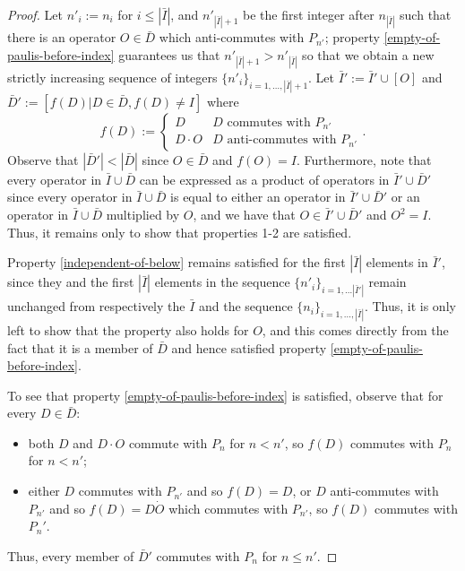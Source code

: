 \documentclass[twocolumn,showpacs,preprintnumbers,amsmath,amssymb,nofootinbib,pra,floatfix]{revtex4}
\newcommand{\lst}{\bar}
\begin{document}
\begin{proof}
Let $n'_i:=n_i$ for $i\le|\lst I|$, and $n'_{|\lst I|+1}$ be the first integer after $n_{|\lst I|}$ such that there is an operator $O\in\lst D$ which anti-commutes with $P_{n'}$;  property \ref{empty-of-paulis-before-index} guarantees us that $n'_{|\lst I|+1}>n'_{|\lst I|}$ so that we obtain a new strictly increasing sequence of integers $\{n'_i\}_{i=1,\dots,|\lst I|+1}$.  Let $\lst I':=\lst I'\cup [O]$ and $\lst D':=[f(D)|D\in \lst D, f(D)\ne I]$ where 
$$f(D):=
\begin{cases}
D & \text{$D$ commutes with $P_{n'}$} \\
D\cdot O & \text{$D$ anti-commutes with $P_{n'}$}
\end{cases}.$$  Observe that $|\lst D'|<|\lst D|$ since $O\in \lst D$ and $f(O)=I$.  Furthermore, note that every operator in $\lst I\cup \lst D$ can be expressed as a product of operators in $\lst I'\cup \lst D'$ since every operator in $\lst I\cup \lst D$ is equal to either an operator in $\lst I'\cup\lst D'$ or an operator in $\lst I\cup\lst D$ multiplied by $O$, and we have that $O\in \lst I'\cup \lst D'$ and $O^2=I$.  Thus, it remains only to show that properties 1-2 are satisfied.

Property \ref{independent-of-below} remains satisfied for the first $|\lst I|$ elements in $\lst I'$, since they and the first $|\lst I|$  elements in the sequence $\{n'_i\}_{i=1,\dots |\lst I'|}$ remain unchanged from respectively the $\lst I$ and the sequence $\{n_i\}_{i= 1,\dots,|\lst I|}$.  Thus, it is only left to show that the property also holds for $O$, and this comes directly from the fact that it is a member of $\lst D$ and hence satisfied property \ref{empty-of-paulis-before-index}.

To see that property \ref{empty-of-paulis-before-index} is satisfied, observe that for every $D\in \lst D$:
\begin{itemize}
\item both $D$ and $D\cdot O$ commute with $P_n$ for $n<n'$, so $f(D)$ commutes with $P_n$ for $n<n'$;
\item either $D$ commutes with $P_{n'}$ and so $f(D)=D$, or $D$ anti-commutes with $P_{n'}$ and so $f(D)=D\dot O$ which commutes with $P_{n'}$, so $f(D)$ commutes with $P_n'$.
\end{itemize} Thus, every member of $\lst D'$ commutes with $P_n$ for $n\le n'$.
\end{proof}
\end{document}
